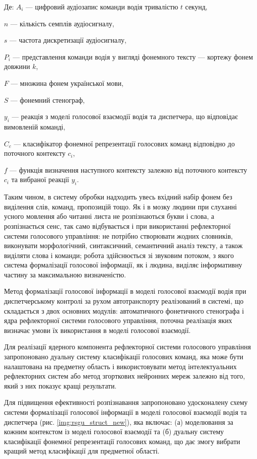 Де: $A_i$ --- цифровий аудіозапис команди водія тривалістю $t$ секунд,

{\settowidth{\leftskip}{Де:\ }
	
	$n$ --- кількість семплів аудіосигналу,
	
	$s$ --- частота дискретизації аудіосигналу,
	
	$P_i$ --- представлення команди водія у вигляді фонемного тексту --- кортежу фонем довжини $k$,
	
	$F$ --- множина фонем української мови,
	
	$S$ --- фонемний стенограф,
	
	$y_i$ --- реакція з моделі голосової взаємодії водія та диспетчера, що відповідає вимовленій команді,
	
	$C_c$ --- класифікатор фонемної репрезентації голосових команд відповідно до поточного контексту $c_i$,
	
	$f$ --- функція визначення наступного контексту залежно від поточного контексту $c_i$ та вибраної реакції $y_i$.
	
}

Таким чином, в систему обробки надходить увесь вхідний набір фонем без виділення слів, команд, пропозицій тощо. Як і в мозку людини при слуханні усного мовлення або читанні листа не розпізнаються букви і слова, а розпізнається сенс, так само відбувається і при використанні рефлекторної системи голосового управління: не потрібно створювати жодних словників, виконувати морфологічний, синтаксичний, семантичний аналіз тексту, а також виділяти слова і команди; робота здійснюється зі звуковим потоком, з якого система формалізації голосової інформації, як і людина, виділяє інформативну частину за максимальною визначеністю.

Метод формалізації голосової інформації в моделі голосової взаємодії водія при диспетчерському контролі за рухом автотранспорту реалізований в системі, що складається з двох основних модулів: автоматичного фонетичного стенографа і ядра рефлекторної системи голосового управління, поточна реалізація яких визначає умови їх використання в моделі голосової взаємодії.

Для реалізації ядерного компонента рефлекторної системи голосового управління запропоновано дуальну систему класифікації голосових команд, яка може бути налаштована на предметну область і використовувати метод інтелектуальних рефлекторних систем або метод згорткових нейронних мереж залежно від того, який з них показує кращі результати.

Для підвищення ефективності розпізнавання запропоновано удосконалену схему системи формалізації голосової інформації в моделі голосової взаємодії водія та диспетчера (рис. \ref{img:rsgu_struct_new}), яка включає: (а) моделювання за кожним контекстом із моделі голосової взаємодії та (б) дуальну систему класифікації фонемної репрезентації голосових команд, що дає змогу вибрати кращий метод класифікації для предметної області.

